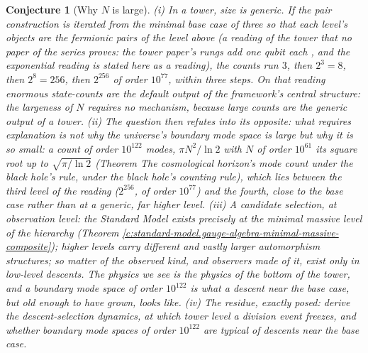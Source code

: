 \documentclass[11pt]{article}
\newtheorem{conjecture}[theorem]{Conjecture}
\theoremstyle{definition}
\theoremstyle{plain}
\newcommand{\changedmark}[2]{\marginpar{\raggedright\scriptsize\color{#1}#2}}
\begin{document}
\begin{conjecture}[Why $N$ is large]\label{c:standard-model.why-large}
\changedmark{BrickRed}{corrected since the deposit}
(i) In a tower, size is generic. If the pair construction is iterated from the minimal base case of three so that each level's objects are the fermionic pairs of the level above (a reading of the tower that no paper of the series proves: the tower paper's rungs add one qubit each \cite[Thm.~4.2]{ButlerT3}, and the exponential reading is stated here as a reading), the counts run $3$, then $2^{3} = 8$, then $2^{8} = 256$, then $2^{256}$ of order $10^{77}$, within three steps. On that reading enormous state-counts are the default output of the framework's central structure: the largeness of $N$ requires no mechanism, because large counts are the generic output of a tower. (ii) The question then refutes into its opposite: what requires explanation is not why the universe's boundary mode space is large but why it is so \emph{small}: a count of order $10^{122}$ modes, $\pi N^{2}/\ln 2$ with $N$ of order $10^{61}$ its square root up to $\sqrt{\pi/\ln 2}$ (Theorem \emph{The cosmological horizon's mode count under the black hole's rule}, under the black hole's counting rule), which lies between the third level of the reading ($2^{256}$, of order $10^{77}$) and the fourth, close to the base case rather than at a generic, far higher level. (iii) A candidate selection, at observation level: the Standard Model exists precisely at the minimal massive level of the hierarchy (Theorem \ref{c:standard-model.gauge-algebra-minimal-massive-composite}); higher levels carry different and vastly larger automorphism structures; so matter of the observed kind, and observers made of it, exist only in low-level descents. The physics we see is the physics of the bottom of the tower, and a boundary mode space of order $10^{122}$ is what a descent near the base case, but old enough to have grown, looks like. (iv) The residue, exactly posed: derive the descent-selection dynamics, at which tower level a division event freezes, and whether boundary mode spaces of order $10^{122}$ are typical of descents near the base case.
\end{conjecture}
\end{document}
